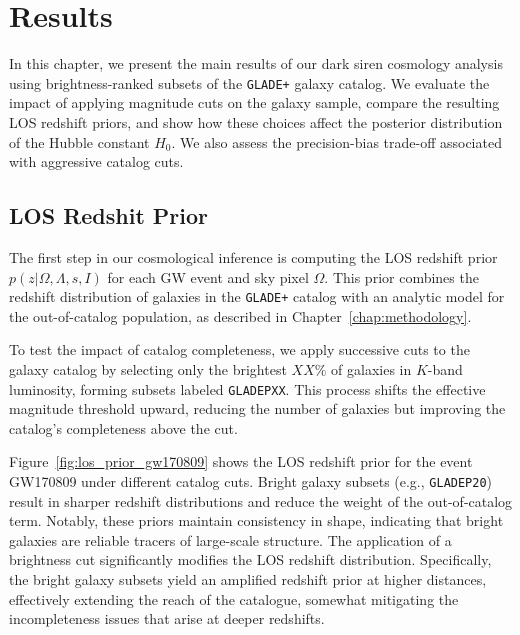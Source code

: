 \chapter{Results}
\label{chap:results}

In this chapter, we present the main results of our dark siren cosmology analysis using brightness-ranked subsets of the \texttt{GLADE+} galaxy catalog. We evaluate the impact of applying magnitude cuts on the galaxy sample, compare the resulting \ac{LOS} redshift priors, and show how these choices affect the posterior distribution of the Hubble constant $H_0$. We also assess the precision-bias trade-off associated with aggressive catalog cuts.

\section{LOS Redshit Prior}
The first step in our cosmological inference is computing the \ac{LOS} redshift prior $p(z | \Omega, \Lambda, s, I)$ for each \ac{GW} event and sky pixel $\Omega$. This prior combines the redshift distribution of galaxies in the \texttt{GLADE+} catalog with an analytic model for the out-of-catalog population, as described in Chapter~\ref{chap:methodology}.

To test the impact of catalog completeness, we apply successive cuts to the galaxy catalog by selecting only the brightest $XX\%$ of galaxies in $K$-band luminosity, forming subsets labeled \texttt{GLADEPXX}. This process shifts the effective magnitude threshold upward, reducing the number of galaxies but improving the catalog's completeness above the cut.

Figure~\ref{fig:los_prior_gw170809} shows the LOS redshift prior for the event GW170809 under different catalog cuts. Bright galaxy subsets (e.g., \texttt{GLADEP20}) result in sharper redshift distributions and reduce the weight of the out-of-catalog term. Notably, these priors maintain consistency in shape, indicating that bright galaxies are reliable tracers of large-scale structure. The application of a brightness cut significantly modifies the \ac{LOS} redshift distribution. Specifically, the bright galaxy subsets yield an amplified redshift prior at higher distances, effectively extending the reach of the catalogue, somewhat mitigating the incompleteness issues that arise at deeper redshifts.

